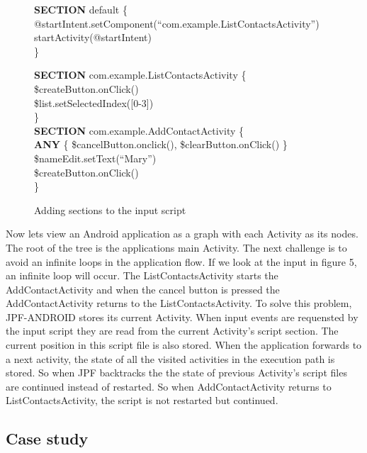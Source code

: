 \documentclass{acm_proc_article-sp}
\begin{document}
\begin{figure}
{\small
{\sf 
\textbf{SECTION} default \{\\
\hspace*{5mm}@startIntent.setComponent(``com.example.ListContactsActivity'')\\
\hspace*{5mm}startActivity(@startIntent)\\
\}

\textbf{SECTION} com.example.ListContactsActivity \{\\
\hspace*{5mm}\$createButton.onClick()\\
\hspace*{5mm}\$list.setSelectedIndex([0-3])\\
\}\\

\textbf{SECTION} com.example.AddContactActivity \{\\
\hspace*{5mm}\textbf{ANY} \{ \$cancelButton.onclick(), \$clearButton.onClick()  \}
\hspace*{5mm}\$nameEdit.setText(``Mary'')\\
\hspace*{5mm}\$createButton.onClick()\\
\}
}
}
\caption{Adding sections to the input script}
\end{figure}

Now lets view an Android application as a graph with each Activity as its nodes. The root of the tree is the applications main Activity. The
next challenge is to avoid an infinite loops in the application flow. If we look at the input in figure 5, an infinite loop will occur. The
ListContactsActivity starts the AddContactActivity and when the cancel button is pressed the AddContactActivity returns to
the ListContactsActivity. To solve this problem, JPF-ANDROID stores its current Activity. When input events are requensted by the input
script they are read from the current Activity's script section. The current position in this script file is also stored. When the
application forwards to a next activity, the state of all the visited activities in the execution path is stored. So when JPF backtracks
the the state of previous Activity's script files are continued instead of restarted. So when AddContactActivity returns to
ListContactsActivity, the script is not restarted but continued.

\subsection{Case study}
\end{document}

